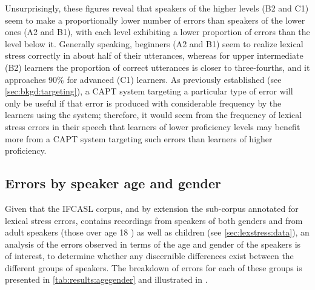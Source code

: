 			
	Unsurprisingly, these figures reveal that  speakers of the higher levels (B2 and C1) seem to make a proportionally lower number of errors than speakers of the lower ones (A2 and B1), with each level exhibiting a lower proportion of errors than the level below it. Generally speaking, beginners  (A2 and B1) seem to realize lexical stress correctly in about half of their utterances, whereas for upper intermediate (B2) learners the proportion of correct utterances is closer to three-fourths, and it approaches 90\% for advanced (C1) learners. As previously established (see \cref{sec:bkgd:targeting}), a CAPT system targeting a particular type of error will only be useful if that error is produced with considerable frequency by the learners using the system; therefore, it would seem from the frequency of lexical stress errors in their speech that learners of lower proficiency levels may benefit more from a CAPT system targeting such errors than learners of higher proficiency. 
			
			
		
		\subsection{Errors by speaker age and gender}
		\label{sec:results:agegender}
			
			
			Given that the IFCASL corpus, and by extension the sub-corpus annotated for lexical stress errors, contains recordings from speakers of both genders and from adult speakers (those over age 18 ) as well as children (see \cref{sec:lexstress:data}), an analysis of the errors observed in terms of the age and gender of the speakers is of interest, to determine whether any discernible differences exist between the different groups of speakers. The breakdown of errors for each of these groups is presented in \cref{tab:results:agegender} and illustrated in .
			
